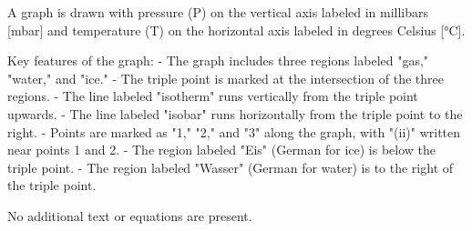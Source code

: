 A graph is drawn with pressure (P) on the vertical axis labeled in millibars [mbar] and temperature (T) on the horizontal axis labeled in degrees Celsius [°C].  

Key features of the graph:  
- The graph includes three regions labeled "gas," "water," and "ice."  
- The triple point is marked at the intersection of the three regions.  
- The line labeled "isotherm" runs vertically from the triple point upwards.  
- The line labeled "isobar" runs horizontally from the triple point to the right.  
- Points are marked as "1," "2," and "3" along the graph, with "(ii)" written near points 1 and 2.  
- The region labeled "Eis" (German for ice) is below the triple point.  
- The region labeled "Wasser" (German for water) is to the right of the triple point.  

No additional text or equations are present.